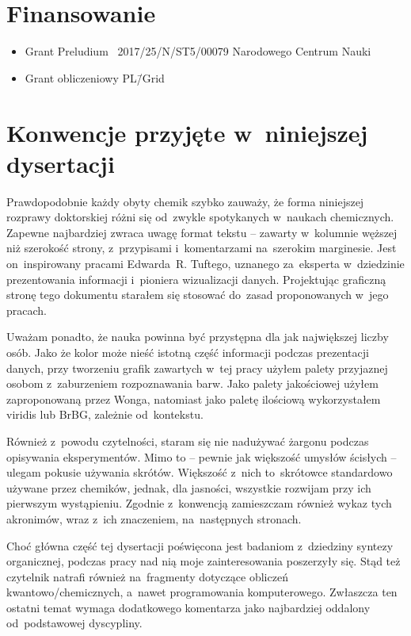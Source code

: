 \section{Finansowanie}\label{intro:founding}
\begin{fullwidth}
\begin{itemize}
  \item Grant Preludium \textnumero~2017/25/N/ST5/00079 Narodowego Centrum Nauki
  \item Grant obliczeniowy PL\=/Grid
\end{itemize}
\end{fullwidth}


\section{Konwencje przyjęte w~niniejszej dysertacji}\label{intro:conventions}

Prawdopodobnie każdy obyty chemik szybko zauważy, że forma niniejszej rozprawy doktorskiej różni się od~zwykle spotykanych w~naukach chemicznych.
Zapewne najbardziej zwraca uwagę format tekstu \--- zawarty w~kolumnie węższej niż szerokość strony, z~przypisami i~komentarzami na~szerokim marginesie.
Jest on~inspirowany pracami Edwarda~R. Tuftego,
uznanego za~eksperta w~dziedzinie prezentowania informacji i~pioniera wizualizacji danych.
Projektując graficzną stronę tego dokumentu starałem się stosować do~zasad proponowanych w~jego pracach.

Uważam ponadto, że nauka powinna być przystępna dla jak największej liczby osób.
Jako że kolor może nieść istotną część informacji podczas prezentacji danych,
przy tworzeniu grafik zawartych w~tej pracy użyłem palety przyjaznej osobom z~zaburzeniem rozpoznawania barw.
Jako palety jakościowej użyłem zaproponowaną przez Wonga,
natomiast jako paletę ilościową wykorzystałem viridis lub BrBG, zależnie od~kontekstu.

Również z~powodu czytelności, staram się nie nadużywać żargonu podczas opisywania eksperymentów.
Mimo to \--- pewnie jak większość umysłów ścisłych \--- ulegam pokusie używania skrótów.
Większość z~nich to~skrótowce standardowo używane przez chemików,
  jednak, dla jasności, wszystkie rozwijam przy ich pierwszym wystąpieniu.
Zgodnie z~konwencją zamieszczam również wykaz tych akronimów,
  wraz z~ich znaczeniem, na~następnych stronach.

Choć główna część tej dysertacji poświęcona jest badaniom z~dziedziny syntezy organicznej,
podczas pracy nad nią moje zainteresowania poszerzyły się.
Stąd też czytelnik natrafi również na~fragmenty dotyczące obliczeń kwantowo\-/chemicznych, a~nawet programowania komputerowego.
Zwłaszcza ten ostatni temat wymaga dodatkowego komentarza jako najbardziej oddalony od~podstawowej dyscypliny.

